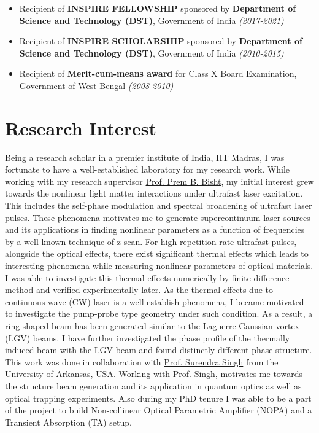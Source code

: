 \documentclass[11pt,a4paper,sans]{moderncv}        %
\begin{document}
\vspace{5pt}

\begin{itemize}
	\item{Recipient of \textbf{INSPIRE FELLOWSHIP} sponsored by \textbf{Department of Science and Technology (DST)}, Government of India \textit{(2017-2021)}}
	
	\item{Recipient of \textbf{INSPIRE SCHOLARSHIP} sponsored by \textbf{Department of Science and Technology (DST)}, Government of India \textit{(2010-2015)}}
	
	\item{Recipient of \textbf{Merit-cum-means award} for Class X Board Examination, Government of West Bengal \textit{(2008-2010)}}
\end{itemize}

\section{Research Interest}
Being a research scholar in a premier institute of India, IIT Madras, I was fortunate to have a well-established laboratory for my research work. While working with my research supervisor \href{https://physics.iitm.ac.in/~prem/}{\color{blue}Prof. Prem B. Bisht}, my initial interest grew towards the nonlinear light matter interactions under ultrafast laser excitation. This includes the self-phase modulation and spectral broadening of ultrafast laser pulses. These phenomena motivates me to generate supercontinuum laser sources and its applications in finding nonlinear parameters as a function of frequencies by a well-known technique of z-scan. For high repetition rate ultrafast pulses, alongside the optical effects, there exist significant thermal effects which leads to interesting phenomena while measuring nonlinear parameters of optical materials. I was able to investigate this thermal effects numerically by finite difference method and verified experimentally later. As the thermal effects due to continuous wave (CW) laser is a well-establish phenomena, I became motivated to investigate the pump-probe type geometry under such condition. As a result, a ring shaped beam has been generated similar to the Laguerre Gaussian vortex (LGV) beams. I have further investigated the phase profile of the thermally induced beam with the LGV beam and found distinctly different phase structure. This work was done in collaboration with \href{https://fulbright.uark.edu/departments/physics/directory/index/uid/ssingh/name/Surendra-Singh/}{\color{blue}Prof. Surendra Singh} from the University of Arkansas, USA. Working with Prof. Singh, motivates me towards the structure beam generation and its application in quantum optics as well as optical trapping experiments. Also during my PhD tenure I was able to be a part of the project to build Non-collinear Optical Parametric Amplifier (NOPA) and a Transient Absorption (TA) setup.
\end{document}
